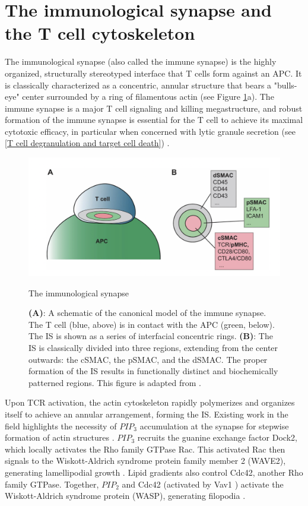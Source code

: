 \section{The immunological synapse and the T cell cytoskeleton}
\label{The immunological synapse and the T cell cytoskeleton}
The immunological synapse (also called the immune synapse) is the highly organized, structurally stereotyped interface that T cells form against an APC. It is classically characterized as a concentric, annular structure that bears a "bulls-eye" center surrounded by a ring of filamentous actin (see Figure \ref{fig:immunesynapse}a). The immune synapse is a major T cell signaling and killing megastructure, and robust formation of the immune synapse is essential for the T cell to achieve its maximal cytotoxic efficacy, in particular when concerned with lytic granule secretion (see \ref{T cell degranulation and target cell death}) \cite{Ritter2015}.

\begin{figure}[htbp]
	\centering
	\includegraphics[width=\textwidth]{../figures/chapter1/immunesynapse.png}
	\caption{The immunological synapse}
	\caption*{\textbf{(A)}: A schematic of the canonical model of the immune synapse. The T cell (blue, above) is in contact with the APC (green, below). The IS is shown as a series of interfacial concentric rings. \textbf{(B)}: The IS is classically divided into three regions, extending from the center outwards: the cSMAC, the pSMAC, and the dSMAC. The proper formation of the IS results in functionally distinct and biochemically patterned regions. This figure is adapted from \cite{Yu2013}.}
	\label{fig:immunesynapse}
\end{figure}

Upon TCR activation, the actin cytoskeleton rapidly polymerizes and organizes itself to achieve an annular arrangement, forming the IS. Existing work in the field highlights the necessity of $PIP_3$ accumulation at the synapse for stepwise formation of actin structures \cite{LeFloch2013}. $PIP_3$ recruits the guanine exchange factor Dock2, which locally activates the Rho family GTPase Rac. This activated Rac then signals to the Wiskott-Aldrich syndrome protein family member 2 (WAVE2), generating lamellipodial growth \cite{LeFloch2013, Derivery2010}. Lipid gradients also control Cdc42, another Rho family GTPase. Together, $PIP_2$ and Cdc42 (activated by Vav1 \cite{Abe2000}) activate the Wiskott-Aldrich syndrome protein (WASP), generating filopodia \cite{KennethE.PrehodaJessicaA.ScottR.DycheMullins2000}.

